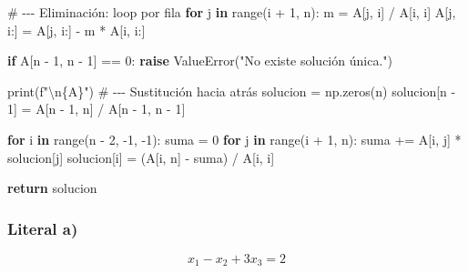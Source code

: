 \documentclass[
  letterpaper,
  DIV=11,
  numbers=noendperiod]{scrartcl}
\newenvironment{Shaded}{\begin{snugshade}}{\end{snugshade}}
\newcommand{\BuiltInTok}[1]{\textcolor[rgb]{0.00,0.23,0.31}{#1}}
\newcommand{\CharTok}[1]{\textcolor[rgb]{0.13,0.47,0.30}{#1}}
\newcommand{\CommentTok}[1]{\textcolor[rgb]{0.37,0.37,0.37}{#1}}
\newcommand{\ControlFlowTok}[1]{\textcolor[rgb]{0.00,0.23,0.31}{\textbf{#1}}}
\newcommand{\DecValTok}[1]{\textcolor[rgb]{0.68,0.00,0.00}{#1}}
\newcommand{\KeywordTok}[1]{\textcolor[rgb]{0.00,0.23,0.31}{\textbf{#1}}}
\newcommand{\NormalTok}[1]{\textcolor[rgb]{0.00,0.23,0.31}{#1}}
\newcommand{\OperatorTok}[1]{\textcolor[rgb]{0.37,0.37,0.37}{#1}}
\newcommand{\PreprocessorTok}[1]{\textcolor[rgb]{0.68,0.00,0.00}{#1}}
\newcommand{\SpecialCharTok}[1]{\textcolor[rgb]{0.37,0.37,0.37}{#1}}
\newcommand{\SpecialStringTok}[1]{\textcolor[rgb]{0.13,0.47,0.30}{#1}}
\newcommand{\StringTok}[1]{\textcolor[rgb]{0.13,0.47,0.30}{#1}}
\begin{document}
\begin{Shaded}
\begin{Highlighting}[]
        \CommentTok{\# {-}{-}{-} Eliminación: loop por fila}
        \ControlFlowTok{for}\NormalTok{ j }\KeywordTok{in} \BuiltInTok{range}\NormalTok{(i }\OperatorTok{+} \DecValTok{1}\NormalTok{, n):}
\NormalTok{            m }\OperatorTok{=}\NormalTok{ A[j, i] }\OperatorTok{/}\NormalTok{ A[i, i]}
\NormalTok{            A[j, i:] }\OperatorTok{=}\NormalTok{ A[j, i:] }\OperatorTok{{-}}\NormalTok{ m }\OperatorTok{*}\NormalTok{ A[i, i:]}


    \ControlFlowTok{if}\NormalTok{ A[n }\OperatorTok{{-}} \DecValTok{1}\NormalTok{, n }\OperatorTok{{-}} \DecValTok{1}\NormalTok{] }\OperatorTok{==} \DecValTok{0}\NormalTok{:}
        \ControlFlowTok{raise} \PreprocessorTok{ValueError}\NormalTok{(}\StringTok{"No existe solución única."}\NormalTok{)}

        \BuiltInTok{print}\NormalTok{(}\SpecialStringTok{f"}\CharTok{\textbackslash{}n}\SpecialCharTok{\{}\NormalTok{A}\SpecialCharTok{\}}\SpecialStringTok{"}\NormalTok{)}
    \CommentTok{\# {-}{-}{-} Sustitución hacia atrás}
\NormalTok{    solucion }\OperatorTok{=}\NormalTok{ np.zeros(n)}
\NormalTok{    solucion[n }\OperatorTok{{-}} \DecValTok{1}\NormalTok{] }\OperatorTok{=}\NormalTok{ A[n }\OperatorTok{{-}} \DecValTok{1}\NormalTok{, n] }\OperatorTok{/}\NormalTok{ A[n }\OperatorTok{{-}} \DecValTok{1}\NormalTok{, n }\OperatorTok{{-}} \DecValTok{1}\NormalTok{]}

    \ControlFlowTok{for}\NormalTok{ i }\KeywordTok{in} \BuiltInTok{range}\NormalTok{(n }\OperatorTok{{-}} \DecValTok{2}\NormalTok{, }\OperatorTok{{-}}\DecValTok{1}\NormalTok{, }\OperatorTok{{-}}\DecValTok{1}\NormalTok{):}
\NormalTok{        suma }\OperatorTok{=} \DecValTok{0}
        \ControlFlowTok{for}\NormalTok{ j }\KeywordTok{in} \BuiltInTok{range}\NormalTok{(i }\OperatorTok{+} \DecValTok{1}\NormalTok{, n):}
\NormalTok{            suma }\OperatorTok{+=}\NormalTok{ A[i, j] }\OperatorTok{*}\NormalTok{ solucion[j]}
\NormalTok{        solucion[i] }\OperatorTok{=}\NormalTok{ (A[i, n] }\OperatorTok{{-}}\NormalTok{ suma) }\OperatorTok{/}\NormalTok{ A[i, i]}

    \ControlFlowTok{return}\NormalTok{ solucion}
\end{Highlighting}
\end{Shaded}

\subsubsection{Literal a)}\label{literal-a-2}

\[x_1 - x_2 + 3x_3 = 2\]
\end{document}
